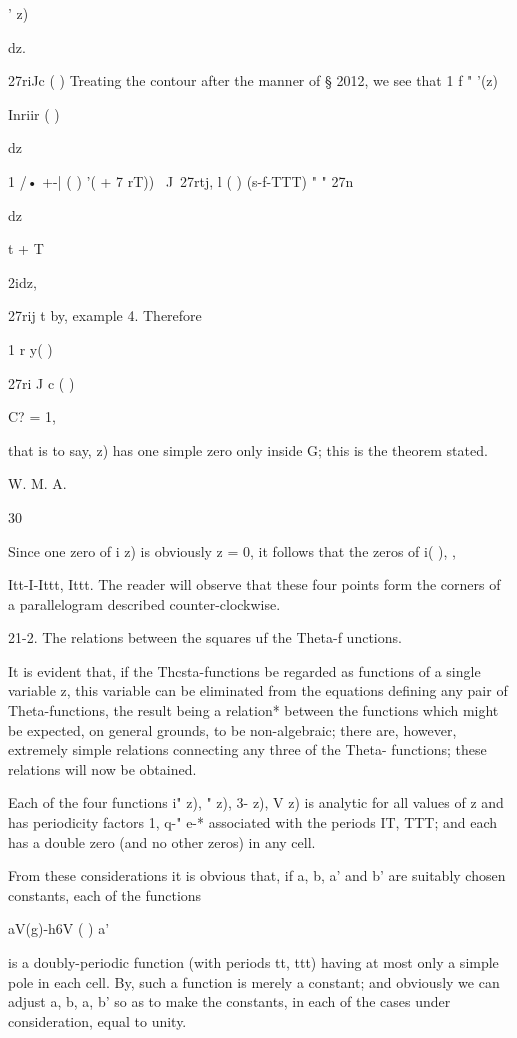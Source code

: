  ' z)

dz.

27riJc ( ) Treating the contour after the manner of § 2012, we see
that 1 f " '(z)

Inriir ( )

dz

1 /• +-| ( ) '( + 7 rT)) \ J\ 27rtj, l ( ) (s-f-TTT) " " 27n

dz

t + T

2idz,

27rij t by, example 4. Therefore

1 r y( )

27ri J c ( )

C? = 1,

that is to say, z) has one simple zero only inside G; this is the
theorem stated.

W. M. A.

30

%
%

Since one zero of i z) is obviously z = 0, it follows that the zeros
of i( ), %
,

Itt-I-Ittt, Ittt. The reader will observe that these four points form
the corners of a parallelogram described counter-clockwise.

21-2. The relations between the squares uf the Theta-f unctions.

It is evident that, if the Thcsta-functions be regarded as functions
of a single variable z, this variable can be eliminated from the
equations defining any pair of Theta-functions, the result being a
relation* between the functions which might be expected, on general
grounds, to be non-algebraic; there are, however, extremely simple
relations connecting any three of the Theta- functions; these
relations will now be obtained.

Each of the four functions i" z), " z), 3- z), V z) is analytic for
all values of z and has periodicity factors 1, q-" e-* associated with
the periods IT, TTT; and each has a double zero (and no other zeros)
in any cell.

From these considerations it is obvious that, if a, b, a' and b' are
suitably chosen constants, each of the functions

aV(g)-h6V ( ) a'%

is a doubly-periodic function (with periods tt, ttt) having at most
only a simple pole in each cell. By, such a function is merely
a constant; and obviously we can adjust a, b, a, b' so as to make the
constants, in each of the cases under consideration, equal to unity.

